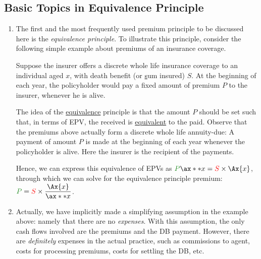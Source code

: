 \subsection{Basic Topics in Equivalence Principle}
\label{it:equiv-prin-basic}
\begin{enumerate}
\item The first and the most frequently used premium principle to be discussed
here is the \emph{equivalence principle}. To illustrate this principle,
consider the following simple example about premiums of an insurance coverage.

Suppose the insurer offers a discrete whole life insurance coverage to an
individual aged \(x\), with death benefit (or \underline{s}um insured) \(S\).
At the beginning of each year, the policyholder would pay a fixed amount of
premium \(P\) to the insurer, whenever he is alive.
\begin{center}
\end{center}
The idea of the \underline{equivalence} principle is that the amount \(P\)
should be set such that, in terms of EPV, the  received is
\underline{equivalent} to the  paid. Observe that the premiums above
actually form a discrete whole life annuity-due: A payment of amount \(P\) is
made at the beginning of each year whenever the policyholder is alive. Here the
insurer is the recipient of the payments.

Hence, we can express this equivalence of EPVs as \(
\gc{P}\ax**{x}=\rc{S}\times \Ax{x}\), through which we can solve for
the equivalence principle premium: \(\displaystyle
\gc{P}=\rc{S}\times \frac{\Ax{x}}{\ax**{x}}\).

\item Actually, we have implicitly made a simplifying assumption in the example
above: namely that there are no \emph{expenses}. With this assumption, the only
cash flows involved are the premiums and the DB payment. However, there are
\emph{definitely} expenses in the actual practice, such as commissions to
agent, costs for processing premiums, costs for settling the DB, etc.


\end{enumerate}
